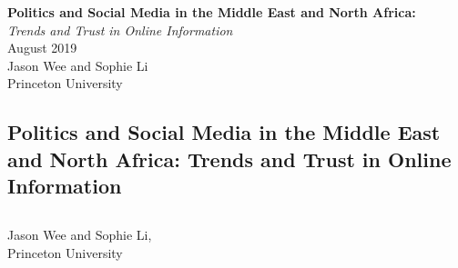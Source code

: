 \documentclass[12pt]{article}
\begin{document}

	\newpage
	\pagestyle{empty}
	\vspace*{2in}
	\begin{center}
		\color{white}\Large\textbf{Politics and Social Media in the Middle East and North Africa:} \\
		\color{white}\Large\textit{Trends and Trust in Online Information} \\
		\vspace*{0.5in}
		\color{white}\large{August 2019} \\
		\vspace*{3.25in}
		\color{white}\large{Jason Wee and Sophie Li} \\
		\color{white}\large{Princeton University}
	\end{center}

	\newpage{}
	\color{gray}
\color{gray}
\pagestyle{fancy}

\begin{center}
	\section*{Politics and Social Media in the Middle East and North Africa: Trends and Trust in Online Information}
	\subsection*{}
	Jason Wee and Sophie Li, \\
	Princeton University
\end{center}
\end{document}
